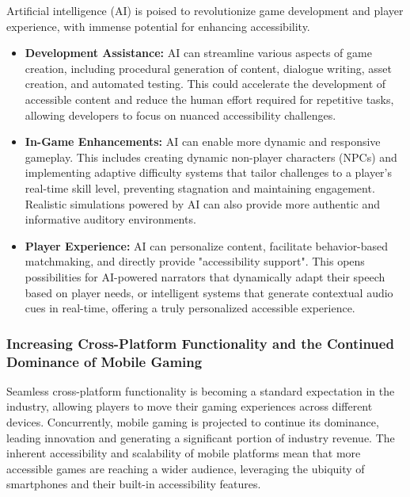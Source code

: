 Artificial intelligence (AI) is poised to revolutionize game development and player experience, with immense potential for enhancing accessibility.
\begin{itemize}
    \item \textbf{Development Assistance:} AI can streamline various aspects of game creation, including procedural generation of content, dialogue writing, asset creation, and automated testing\supercite{SlavnaStudio2025}. This could accelerate the development of accessible content and reduce the human effort required for repetitive tasks, allowing developers to focus on nuanced accessibility challenges.
    \item \textbf{In-Game Enhancements:} AI can enable more dynamic and responsive gameplay. This includes creating dynamic non-player characters (NPCs) and implementing adaptive difficulty systems that tailor challenges to a player's real-time skill level, preventing stagnation and maintaining engagement\supercite{SlavnaStudio2025}. Realistic simulations powered by AI can also provide more authentic and informative auditory environments.
    \item \textbf{Player Experience:} AI can personalize content, facilitate behavior-based matchmaking, and directly provide "accessibility support"\supercite{SlavnaStudio2025}. This opens possibilities for AI-powered narrators that dynamically adapt their speech based on player needs, or intelligent systems that generate contextual audio cues in real-time, offering a truly personalized accessible experience.
\end{itemize}

\subsubsection{Increasing Cross-Platform Functionality and the Continued Dominance of Mobile Gaming}

Seamless cross-platform functionality is becoming a standard expectation in the industry, allowing players to move their gaming experiences across different devices\supercite{SlavnaStudio2025}. Concurrently, mobile gaming is projected to continue its dominance, leading innovation and generating a significant portion of industry revenue\supercite{SlavnaStudio2025}. The inherent accessibility and scalability of mobile platforms mean that more accessible games are reaching a wider audience, leveraging the ubiquity of smartphones and their built-in accessibility features.


